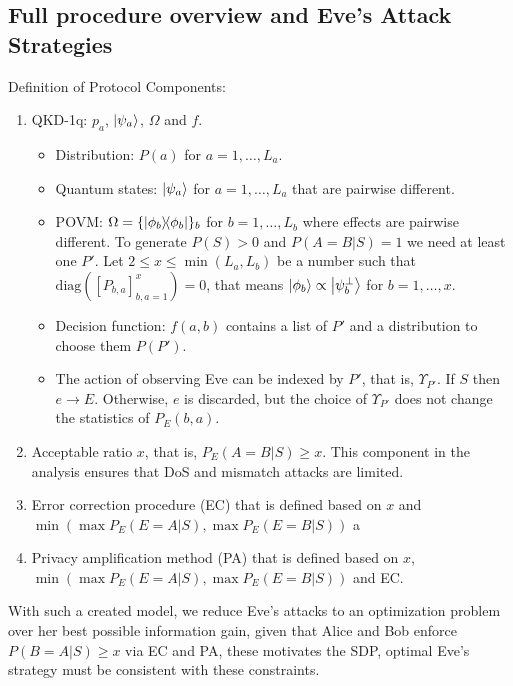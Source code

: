 \documentclass[a4paper,twocolumn,11pt,unpublished]{quantumarticle}
\newcommand{\proj}[1]{\ensuremath{\ketbra{#1}{#1}}}
\begin{document}
\subsection{Full procedure overview and Eve’s Attack Strategies}
Definition of Protocol Components:
\begin{enumerate}
    \item QKD-1q: $p_a$, $\ket{\psi_a}$, $\Omega$ and $f$.
    \begin{itemize}
    \item Distribution: $P(a)$ for $a=1,\ldots,L_a$. 
    \item Quantum states: $ \ket{\psi_a}$ for $a=1,\ldots,L_a$ that are pairwise
different.
    \item POVM: $\Omega = \{\proj{\phi_b}\}_b$ for $b=1,\ldots,L_b$ where
    effects are pairwise different. To generate $P(S) > 0$ and
    $P(A=B|S) = 1$ we need at least one $P'$. Let
    $2\le x\le \min(L_a,L_b)$ be a number such that
    $\mathrm{diag}([P_{b,a}]_{b,a=1}^x) = 0$, that means
    $\ket{\phi_b} \propto \ket{\psi^\perp_b}$ for $b=1,\ldots,x$.
    \item Decision function: $f(a, b)$ contains a list of $P'$ and a
    distribution to choose them $P(P')$.
    \item The action of observing Eve can be indexed by $P'$, that is,
$\Upsilon_{P'}$. If $S$ then $e \to E$. Otherwise, $e$ is discarded, but the
choice of $\Upsilon_{P'}$ does not change the statistics of $P_E(b,a)$.
\end{itemize}
    \item Acceptable ratio $x$, that is, $P_E(A=B|S) \ge x$. This component
    in the analysis ensures that DoS and mismatch attacks are limited.
    \item Error correction procedure (EC) that is defined based on $x$ and
$\min(\max P_E(E=A|S), \max P_E(E=B|S))$ a
    \item Privacy amplification method (PA) that is defined based on $x$,
    $\min(\max P_E(E=A|S), \max P_E(E=B|S))$ and EC.
\end{enumerate}
With such a created model, we reduce Eve's attacks to an optimization problem
over her best possible information gain, given that Alice and Bob enforce
$P(B=A|S)\ge x$ via EC and PA, these motivates the SDP, optimal Eve's strategy
must be consistent with these constraints.
\end{document}
